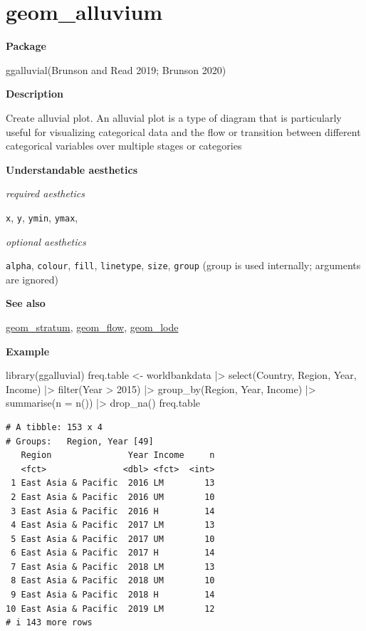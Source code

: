 \documentclass[
  letterpaper,
  DIV=11,
  numbers=noendperiod]{scrreprt}
\newenvironment{Shaded}{\begin{snugshade}}{\end{snugshade}}
\newcommand{\AttributeTok}[1]{\textcolor[rgb]{0.40,0.45,0.13}{#1}}
\newcommand{\DecValTok}[1]{\textcolor[rgb]{0.68,0.00,0.00}{#1}}
\newcommand{\FunctionTok}[1]{\textcolor[rgb]{0.28,0.35,0.67}{#1}}
\newcommand{\NormalTok}[1]{\textcolor[rgb]{0.00,0.23,0.31}{#1}}
\newcommand{\OtherTok}[1]{\textcolor[rgb]{0.00,0.23,0.31}{#1}}
\newcommand{\SpecialCharTok}[1]{\textcolor[rgb]{0.37,0.37,0.37}{#1}}
\begin{document}
\section{geom\_alluvium}\label{alluvium}

\textbf{Package}

ggalluvial(Brunson and Read 2019; Brunson 2020)

\textbf{Description}

Create alluvial plot. An alluvial plot is a type of diagram that is
particularly useful for visualizing categorical data and the flow or
transition between different categorical variables over multiple stages
or categories

\textbf{Understandable aesthetics}

\emph{required aesthetics}

\texttt{x}, \texttt{y}, \texttt{ymin}, \texttt{ymax},

\emph{optional aesthetics}

\texttt{alpha}, \texttt{colour}, \texttt{fill}, \texttt{linetype},
\texttt{size}, \texttt{group} (group is used internally; arguments are
ignored)

\textbf{See also}

\hyperref[stratum]{geom\_stratum}, \hyperref[flow]{geom\_flow},
\hyperref[lode]{geom\_lode}

\textbf{Example}

\begin{Shaded}
\begin{Highlighting}[]
\FunctionTok{library}\NormalTok{(ggalluvial)}
\NormalTok{freq.table }\OtherTok{\textless{}{-}}\NormalTok{ worldbankdata }\SpecialCharTok{|\textgreater{}}
  \FunctionTok{select}\NormalTok{(Country, Region, Year, Income) }\SpecialCharTok{|\textgreater{}}
  \FunctionTok{filter}\NormalTok{(Year }\SpecialCharTok{\textgreater{}} \DecValTok{2015}\NormalTok{) }\SpecialCharTok{|\textgreater{}}
  \FunctionTok{group\_by}\NormalTok{(Region, Year, Income) }\SpecialCharTok{|\textgreater{}}
  \FunctionTok{summarise}\NormalTok{(}\AttributeTok{n =} \FunctionTok{n}\NormalTok{()) }\SpecialCharTok{|\textgreater{}}
  \FunctionTok{drop\_na}\NormalTok{()}
\NormalTok{freq.table}
\end{Highlighting}
\end{Shaded}

\begin{verbatim}
# A tibble: 153 x 4
# Groups:   Region, Year [49]
   Region               Year Income     n
   <fct>               <dbl> <fct>  <int>
 1 East Asia & Pacific  2016 LM        13
 2 East Asia & Pacific  2016 UM        10
 3 East Asia & Pacific  2016 H         14
 4 East Asia & Pacific  2017 LM        13
 5 East Asia & Pacific  2017 UM        10
 6 East Asia & Pacific  2017 H         14
 7 East Asia & Pacific  2018 LM        13
 8 East Asia & Pacific  2018 UM        10
 9 East Asia & Pacific  2018 H         14
10 East Asia & Pacific  2019 LM        12
# i 143 more rows
\end{verbatim}
\end{document}
